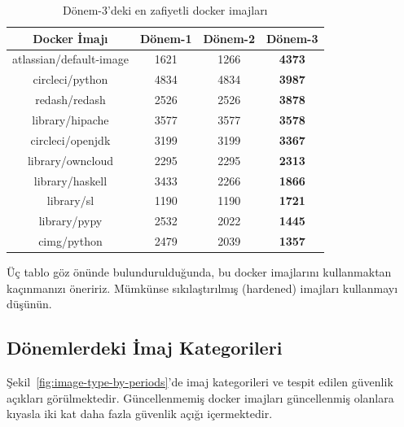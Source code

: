 \begin{table}
    \centering
    \begin{tabular}{ |c|c|c|>{\bfseries}c| }
        \hline
        Docker İmajı & Dönem-1 & Dönem-2 & Dönem-3 \\
        \hline
        atlassian/default-image & 1621 & 1266 & 4373 \\
        circleci/python         & 4834 & 4834 & 3987 \\
        redash/redash           & 2526 & 2526 & 3878 \\
        library/hipache         & 3577 & 3577 & 3578 \\
        circleci/openjdk        & 3199 & 3199 & 3367 \\
        library/owncloud        & 2295 & 2295 & 2313 \\
        library/haskell         & 3433 & 2266 & 1866 \\
        library/sl              & 1190 & 1190 & 1721 \\
        library/pypy            & 2532 & 2022 & 1445 \\
        cimg/python             & 2479 & 2039 & 1357 \\
        \hline
    \end{tabular}
    \caption{Dönem-3'deki en zafiyetli docker imajları}\label{tab:most-vuln-images-p3}
\end{table}

Üç tablo göz önünde bulundurulduğunda, bu docker imajlarını kullanmaktan kaçınmanızı öneririz. Mümkünse sıkılaştırılmış (hardened) imajları kullanmayı düşünün.

\subsection{Dönemlerdeki İmaj Kategorileri}\label{subsec:image-categories-in-periods}

Şekil~\ref{fig:image-type-by-periods}'de imaj kategorileri ve tespit edilen güvenlik açıkları görülmektedir. Güncellenmemiş docker imajları güncellenmiş olanlara kıyasla iki kat daha fazla güvenlik açığı içermektedir.

